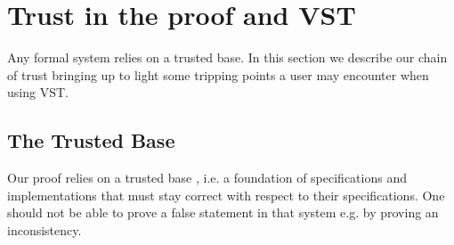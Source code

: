 \section{Trust in the proof and VST}
\label{sec5-vst}

Any formal system relies on a trusted base. In this section we describe our
chain of trust bringing up to light some tripping points a user may encounter
when using VST.

\subsection{The Trusted Base}

Our proof relies on a trusted base , i.e. a foundation of specifications
and implementations that must stay correct with respect to their specifications.
One should not be able to prove a false statement in that system e.g. by proving
an inconsistency.


